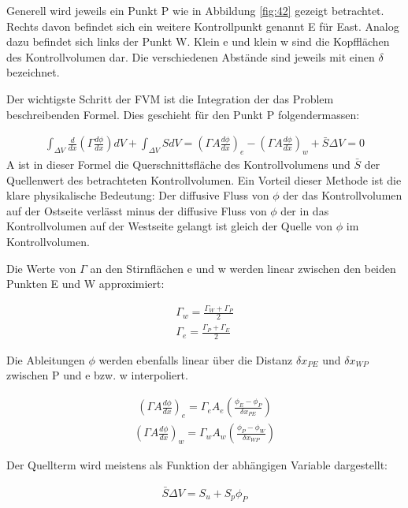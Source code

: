 \documentclass[a4paper]{scrartcl}
\begin{document}
Generell wird jeweils ein Punkt P wie in Abbildung \ref{fig:42} gezeigt
betrachtet. Rechts davon befindet sich ein weitere Kontrollpunkt genannt E für
East. Analog dazu befindet sich links der Punkt W. Klein e und klein w sind die
Kopfflächen des Kontrollvolumen dar. Die verschiedenen Abstände sind jeweils mit
einen $\delta$ bezeichnet.

Der wichtigste Schritt der FVM ist die Integration der das Problem
beschreibenden Formel. Dies geschieht für den Punkt P folgendermassen:

\begin{align}
\int_{\Delta V} \frac{d}{dx} \left( \Gamma \frac{d\phi}{dx}\right)dV +
\int_{\Delta V}SdV = \left(\Gamma A
\frac{d\phi}{dx}\right)_{e}-\left(\Gamma A \frac{d\phi}{dx}\right)_w +
\bar{S}\Delta V = 0
\end{align}
A ist in dieser Formel die Querschnittsfläche des Kontrollvolumens und $\bar{S}$
der Quellenwert des betrachteten Kontrollvolumen. Ein Vorteil dieser Methode ist
die klare physikalische Bedeutung: Der diffusive Fluss von $\phi$ der das
Kontrollvolumen auf der Ostseite verlässt minus der diffusive Fluss von $\phi$
der in das Kontrollvolumen auf der Westseite gelangt ist gleich der Quelle von
$\phi$ im Kontrollvolumen.

Die Werte von $\Gamma$ an den Stirnflächen e und w werden linear zwischen den
beiden Punkten E und W approximiert:

\begin{align}
\Gamma_w=\frac{\Gamma_W+\Gamma_P}{2} \\
\Gamma_e=\frac{\Gamma_P+\Gamma_E}{2}
\end{align}

Die Ableitungen $\phi$ werden ebenfalls linear über die Distanz $\delta x_{PE}$
und $\delta x_{WP}$ zwischen P und e bzw. w interpoliert.

\begin{align}
\left(\Gamma A \frac{d\phi}{dx}\right)_e = \Gamma_e A_e
\left(\frac{\phi_E - \phi_P}{\delta x_{PE}}\right)
\end{align}
\begin{align}
\left(\Gamma A \frac{d\phi}{dx}\right)_w = \Gamma_w A_w
\left(\frac{\phi_P - \phi_W}{\delta x_{WP}}\right)
\end{align}

Der Quellterm wird meistens als Funktion der abhängigen Variable dargestellt:

\begin{align}
\bar{S}\Delta V = S_u+S_p\phi_P
\end{align}
\end{document}

